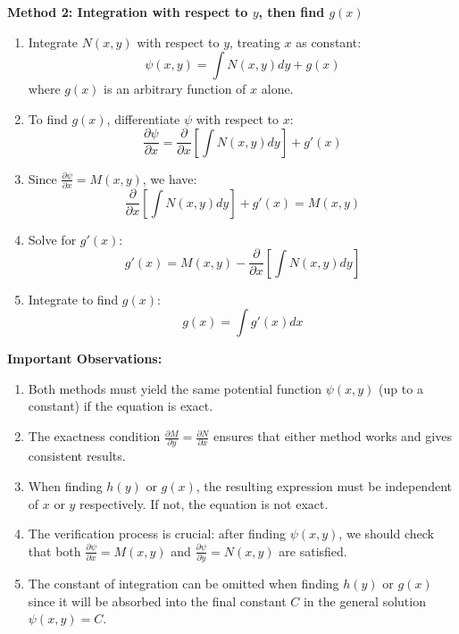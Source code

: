 \noindent \textbf{Method 2: Integration with respect to $y$, then find $g(x)$} \\
\begin{enumerate}
    \item Integrate $N(x,y)$ with respect to $y$, treating $x$ as constant:
    \[
    \psi(x,y) = \int N(x,y)dy + g(x)
    \]
    where $g(x)$ is an arbitrary function of $x$ alone.
    
    \item To find $g(x)$, differentiate $\psi$ with respect to $x$:
    \[
    \frac{\partial \psi}{\partial x} = \frac{\partial}{\partial x}\left[\int N(x,y)dy\right] + g'(x)
    \]
    
    \item Since $\frac{\partial \psi}{\partial x} = M(x,y)$, we have:
    \[
    \frac{\partial}{\partial x}\left[\int N(x,y)dy\right] + g'(x) = M(x,y)
    \]
    
    \item Solve for $g'(x)$:
    \[
    g'(x) = M(x,y) - \frac{\partial}{\partial x}\left[\int N(x,y)dy\right]
    \]
    
    \item Integrate to find $g(x)$:
    \[
    g(x) = \int g'(x)dx
    \]
\end{enumerate}

\noindent \textbf{Important Observations:}
\begin{enumerate}
    \item Both methods must yield the same potential function $\psi(x,y)$ (up to a constant) if the equation is exact.
    
    \item The exactness condition $\frac{\partial M}{\partial y} = \frac{\partial N}{\partial x}$ ensures that either method works and gives consistent results.
    
    \item When finding $h(y)$ or $g(x)$, the resulting expression must be independent of $x$ or $y$ respectively. If not, the equation is not exact.
    
    \item The verification process is crucial: after finding $\psi(x,y)$, we should check that both $\frac{\partial \psi}{\partial x} = M(x,y)$ and $\frac{\partial \psi}{\partial y} = N(x,y)$ are satisfied.
    
    \item The constant of integration can be omitted when finding $h(y)$ or $g(x)$ since it will be absorbed into the final constant $C$ in the general solution $\psi(x,y) = C$.
\end{enumerate}

